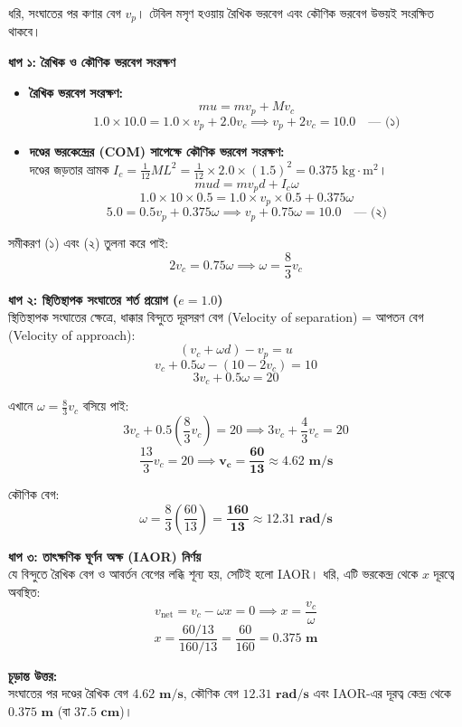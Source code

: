 \documentclass[12pt, a4paper]{article}
\begin{document}
\begin{tcolorbox}[solutionbox={সমাধান (Solution)}]
\noindent
ধরি, সংঘাতের পর কণার বেগ $v_p$। টেবিল মসৃণ হওয়ায় রৈখিক ভরবেগ এবং কৌণিক ভরবেগ উভয়ই সংরক্ষিত থাকবে।

\vspace{0.5em}
\noindent
\textbf{ধাপ ১: রৈখিক ও কৌণিক ভরবেগ সংরক্ষণ} \\
\begin{itemize}[leftmargin=*, parsep=0.4ex]
    \item \textbf{রৈখিক ভরবেগ সংরক্ষণ:}
    $$m u = m v_p + M v_c$$ 
    $$1.0 \times 10.0 = 1.0 \times v_p + 2.0 v_c \implies v_p + 2 v_c = 10.0 \quad \text{--- (১)}$$
    
    \item \textbf{দণ্ডের ভরকেন্দ্রের (COM) সাপেক্ষে কৌণিক ভরবেগ সংরক্ষণ:} \\
    দণ্ডের জড়তার ভ্রামক $I_c = \frac{1}{12} M L^2 = \frac{1}{12} \times 2.0 \times (1.5)^2 = 0.375\text{ kg}\cdot\text{m}^2$।
    $$m u d = m v_p d + I_c \omega$$ 
    $$1.0 \times 10 \times 0.5 = 1.0 \times v_p \times 0.5 + 0.375 \omega$$ 
    $$5.0 = 0.5 v_p + 0.375 \omega \implies v_p + 0.75 \omega = 10.0 \quad \text{--- (২)}$$
\end{itemize}

সমীকরণ (১) এবং (২) তুলনা করে পাই: 
$$2 v_c = 0.75 \omega \implies \omega = \frac{8}{3} v_c$$

\vspace{0.5em}
\noindent
\textbf{ধাপ ২: স্থিতিস্থাপক সংঘাতের শর্ত প্রয়োগ ($e = 1.0$)} \\
স্থিতিস্থাপক সংঘাতের ক্ষেত্রে, ধাক্কার বিন্দুতে দূরসরণ বেগ (Velocity of separation) = আপতন বেগ (Velocity of approach):
$$(v_c + \omega d) - v_p = u$$ 
$$v_c + 0.5 \omega - (10 - 2 v_c) = 10$$ 
$$3 v_c + 0.5 \omega = 20$$

এখানে $\omega = \frac{8}{3} v_c$ বসিয়ে পাই: 
$$3 v_c + 0.5 \left(\frac{8}{3} v_c\right) = 20 \implies 3 v_c + \frac{4}{3} v_c = 20$$
$$\frac{13}{3} v_c = 20 \implies \mathbf{v_c = \frac{60}{13} \approx 4.62\text{ m/s}}$$

কৌণিক বেগ: 
$$\omega = \frac{8}{3} \left(\frac{60}{13}\right) = \mathbf{\frac{160}{13} \approx 12.31\text{ rad/s}}$$

\vspace{0.5em}
\noindent
\textbf{ধাপ ৩: তাৎক্ষণিক ঘূর্ণন অক্ষ (IAOR) নির্ণয়} \\
যে বিন্দুতে রৈখিক বেগ ও আবর্তন বেগের লব্ধি শূন্য হয়, সেটিই হলো IAOR। ধরি, এটি ভরকেন্দ্র থেকে $x$ দূরত্বে অবস্থিত:
$$v_{\text{net}} = v_c - \omega x = 0 \implies x = \frac{v_c}{\omega}$$
$$x = \frac{60/13}{160/13} = \frac{60}{160} = \mathbf{0.375\text{ m}}$$

\vspace{1em}
\begin{tcolorbox}[answerbox]
\textbf{চূড়ান্ত উত্তর:} \\
সংঘাতের পর দণ্ডের রৈখিক বেগ $\mathbf{4.62\text{ m/s}}$, কৌণিক বেগ $\mathbf{12.31\text{ rad/s}}$ এবং IAOR-এর দূরত্ব কেন্দ্র থেকে $\mathbf{0.375\text{ m}}$ (বা $\mathbf{37.5\text{ cm}}$)।
\end{tcolorbox}
\end{tcolorbox}
\end{document}
